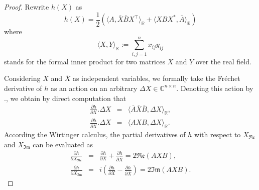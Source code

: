 \documentclass[sn-mathphys-num]{sn-jnl}%
\theoremstyle{thmstyleone}%
\theoremstyle{thmstyletwo}%
\theoremstyle{thmstylethree}%
\begin{document}
\begin{proof}


Rewrite $h(X)$ as
\begin{displaymath}
h(X)= \frac{1}{2}  \left(\langle  A, \overline{X}\overline{B}X^\top \rangle_{\mathbb{R}} + \langle  XBX^*, \overline{A}
 \rangle_{\mathbb{R}} \right) 
\end{displaymath}
where
\begin{equation*}
\langle X,Y \rangle_{\mathbb{R}}:=\sum_{i,j=1}^{n}
x_{ij}y_{ij} \label{eq:real_inner_product}
\end{equation*}
stands for the formal inner product for two matrices $X$ and $Y$ over the real field.

Considering $X$ and $\overline{X}$ as independent variables,
we  formally take the Fr\'{e}chet derivative of $h$ as an action on an arbitrary ${\Delta X} \in \mathbb{C}^{n\times n}$. Denoting this action by $.$, we obtain by direct computation that 
\begin{eqnarray*}
\frac{\partial h}{\partial X}.{\Delta X} &=&
\langle \overline{A}\overline{X}\overline{B},  \Delta X\rangle_{\mathbb{R}},  \\
\frac{\partial h}{\partial \overline{X}}.{\Delta X} &=&
\langle A X B,  \Delta X\rangle_{\mathbb{R}}. \label{eq:Frechet}
\end{eqnarray*}
According the Wirtinger calculus, the partial derivatives of $h$ with respect to $X_{\mathfrak{Re}}$  and $X_{\mathfrak{Im}}$ can be evaluated  as
\begin{eqnarray*}
\frac{\partial h}{\partial X_{\mathfrak{Re}}} &=& \frac{\partial h}{\partial X} + \frac{\partial h}{\partial \overline{X}} = 2 \mathfrak{Re}(AXB),\\
\frac{\partial h}{\partial X_{\mathfrak{Im}}} &=& i\left(\frac{\partial h}{\partial X} - \frac{\partial h}{\partial \overline{X}}\right) = 2 \mathfrak{Im}(AXB). \label{eq:Frechet2}
\end{eqnarray*}
\end{proof}
\end{document}
